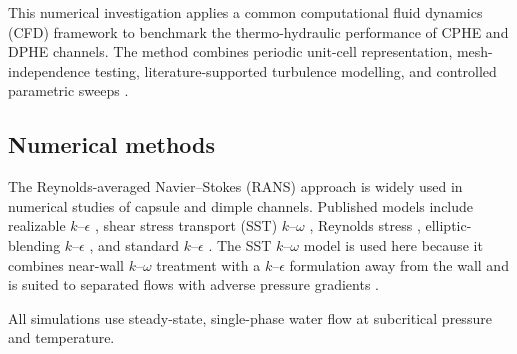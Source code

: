 \documentclass[energies,article,submit,moreauthors,noheaderline]{Definitions/mdpi}
\begin{document}
This numerical investigation applies a common computational fluid dynamics (CFD) framework to benchmark the thermo-hydraulic performance of CPHE and DPHE channels. The method combines periodic unit-cell representation, mesh-independence testing, literature-supported turbulence modelling, and controlled parametric sweeps \citep{jiang2019, mocnik2020}.

\subsection{Numerical methods}
\label{sec:numerical_methods}

The Reynolds-averaged Navier--Stokes (RANS) approach is widely used in numerical studies of capsule and dimple channels. Published models include realizable $k$--$\epsilon$ \citep{kumar2019, jing2019, mocnik2020, mocnik2024}, shear stress transport (SST) $k$--$\omega$ \citep{hamedi2024, jiang2019a, jiang2020, mocnik2020, mocnik2024, torre2019}, Reynolds stress \citep{shao2024, mocnik2023}, elliptic-blending $k$--$\epsilon$ \citep{arsenyeva2019, piper2019}, and standard $k$--$\epsilon$ \citep{soman2022}. The SST $k$--$\omega$ model is used here because it combines near-wall $k$--$\omega$ treatment with a $k$--$\epsilon$ formulation away from the wall and is suited to separated flows with adverse pressure gradients \citep{kanaris2006, khail2023, menter1994}.

All simulations use steady-state, single-phase water flow at subcritical pressure and temperature.
\end{document}
